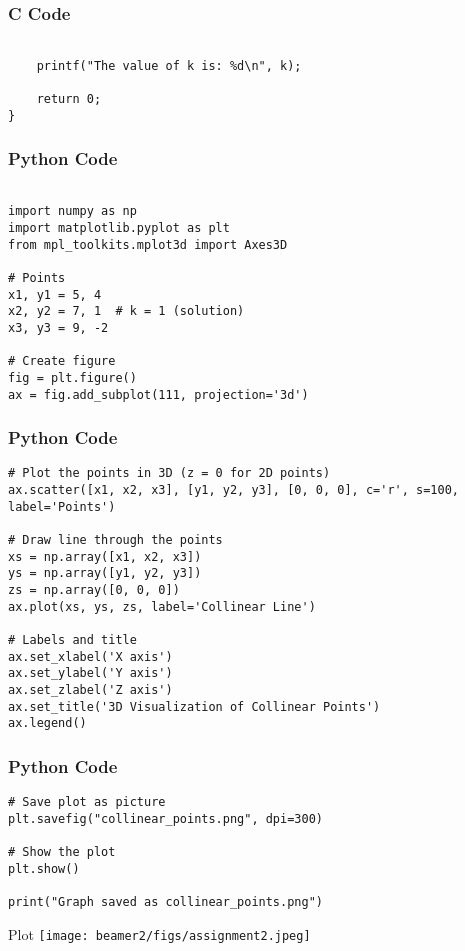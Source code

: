 \documentclass{beamer}
\begin{document}
    \begin{frame}[fragile]
    \frametitle{C Code }

    \begin{lstlisting}

    printf("The value of k is: %d\n", k);

    return 0;
}

    \end{lstlisting}
\end{frame}





\begin{frame}[fragile]
    \frametitle{Python Code }
    \begin{lstlisting}
    
import numpy as np
import matplotlib.pyplot as plt
from mpl_toolkits.mplot3d import Axes3D

# Points
x1, y1 = 5, 4
x2, y2 = 7, 1  # k = 1 (solution)
x3, y3 = 9, -2

# Create figure
fig = plt.figure()
ax = fig.add_subplot(111, projection='3d')
 \end{lstlisting}

\end{frame}
\begin{frame}[fragile]
    \frametitle{Python Code }
    \begin{lstlisting}
# Plot the points in 3D (z = 0 for 2D points)
ax.scatter([x1, x2, x3], [y1, y2, y3], [0, 0, 0], c='r', s=100, label='Points')

# Draw line through the points
xs = np.array([x1, x2, x3])
ys = np.array([y1, y2, y3])
zs = np.array([0, 0, 0])
ax.plot(xs, ys, zs, label='Collinear Line')

# Labels and title
ax.set_xlabel('X axis')
ax.set_ylabel('Y axis')
ax.set_zlabel('Z axis')
ax.set_title('3D Visualization of Collinear Points')
ax.legend()
\end{lstlisting}

\end{frame}
\begin{frame}[fragile]
    \frametitle{Python Code }
    \begin{lstlisting}
# Save plot as picture
plt.savefig("collinear_points.png", dpi=300)

# Show the plot
plt.show()

print("Graph saved as collinear_points.png")
     \end{lstlisting}

\end{frame}

\begin{frame}{Plot}
    \centering
    \texttt{[image: beamer2/figs/assignment2.jpeg]}     
\end{frame}
\end{document}
